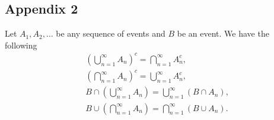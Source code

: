 \documentclass[11pt]{article}
\begin{document}
\subsection{Appendix 2}

Let $A_1,A_2,\ldots$ be any sequence of events and $B$ be an event. We have the following
\begin{align*}
& \left(\bigcup_{n=1}^\infty A_n\right)^c = \bigcap_{n=1}^\infty A_n^c, \\
& \left(\bigcap_{n=1}^\infty A_n\right)^c = \bigcup_{n=1}^\infty A_n^c, \\
& B\cap\left(\bigcup_{n=1}^\infty A_n\right) = \bigcup_{n=1}^\infty (B\cap A_n),\\
& B\cup\left(\bigcap_{n=1}^\infty A_n\right) = \bigcap_{n=1}^\infty (B\cup A_n).
\end{align*}
\end{document}
